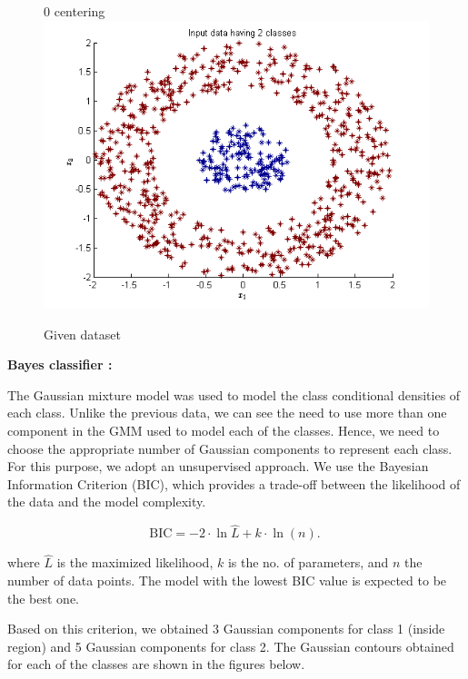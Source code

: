 \documentclass{article}
\begin{document}
\begin{figure}[H]
0
centering
\includegraphics[width=\linewidth]{Classification/nonlinearlySeparable/input_data.png}
\caption{Given dataset}
\end{figure}


\textbf{Bayes classifier :}  \\[10pt]
\begin{flushleft}

The Gaussian mixture model was used to model the class conditional densities of each class. Unlike the previous data, we can see the need to use more than one component in the GMM used to model each of the classes. Hence, we need to choose the appropriate number of Gaussian components to represent each class.
\\[10pt]

For this purpose, we adopt an unsupervised approach. We use the Bayesian Information Criterion (BIC), which provides a trade-off between the likelihood of the data and the model complexity.

\[ \mathrm{BIC} = {-2 \cdot \ln{\hat L} + k \cdot \ln(n)}. \ \]

where $\hat L$ is the maximized likelihood, $k$ is the no. of parameters, and $n$ the number of data points. The model with the lowest BIC value is expected to be the best one.


Based on this criterion, we obtained 3 Gaussian components for class 1 (inside region) and 5 Gaussian components for class 2. The Gaussian contours obtained for each of the classes are shown in the figures below.



\end{flushleft}
\end{document}
